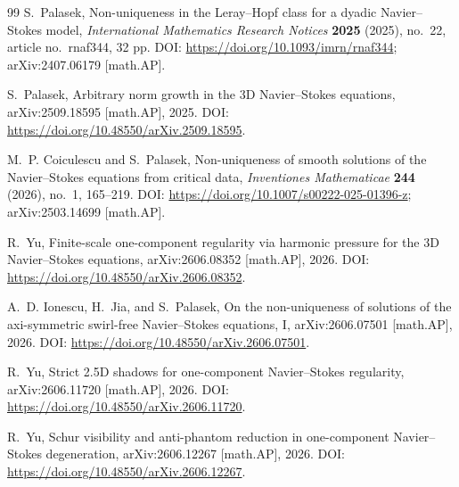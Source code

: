 \documentclass[11pt]{article}
\numberwithin{equation}{section}
\begin{document}
\begin{thebibliography}{99}
S.~Palasek,
\newblock Non-uniqueness in the Leray--Hopf class for a dyadic Navier--Stokes model,
\newblock \emph{International Mathematics Research Notices} \textbf{2025} (2025), no.~22, article no.~rnaf344, 32 pp.
\newblock DOI: \url{https://doi.org/10.1093/imrn/rnaf344}; arXiv:2407.06179 [math.AP].

S.~Palasek,
\newblock Arbitrary norm growth in the 3D Navier--Stokes equations,
\newblock arXiv:2509.18595 [math.AP], 2025.
\newblock DOI: \url{https://doi.org/10.48550/arXiv.2509.18595}.

M.~P. Coiculescu and S.~Palasek,
\newblock Non-uniqueness of smooth solutions of the Navier--Stokes equations from critical data,
\newblock \emph{Inventiones Mathematicae} \textbf{244} (2026), no.~1, 165--219.
\newblock DOI: \url{https://doi.org/10.1007/s00222-025-01396-z}; arXiv:2503.14699 [math.AP].

R.~Yu,
\newblock Finite-scale one-component regularity via harmonic pressure for the 3D Navier--Stokes equations,
\newblock arXiv:2606.08352 [math.AP], 2026.
\newblock DOI: \url{https://doi.org/10.48550/arXiv.2606.08352}.

A.~D. Ionescu, H.~Jia, and S.~Palasek,
\newblock On the non-uniqueness of solutions of the axi-symmetric swirl-free Navier--Stokes equations, I,
\newblock arXiv:2606.07501 [math.AP], 2026.
\newblock DOI: \url{https://doi.org/10.48550/arXiv.2606.07501}.

R.~Yu,
\newblock Strict 2.5D shadows for one-component Navier--Stokes regularity,
\newblock arXiv:2606.11720 [math.AP], 2026.
\newblock DOI: \url{https://doi.org/10.48550/arXiv.2606.11720}.

R.~Yu,
\newblock Schur visibility and anti-phantom reduction in one-component Navier--Stokes degeneration,
\newblock arXiv:2606.12267 [math.AP], 2026.
\newblock DOI: \url{https://doi.org/10.48550/arXiv.2606.12267}.

\end{thebibliography}
\end{document}
